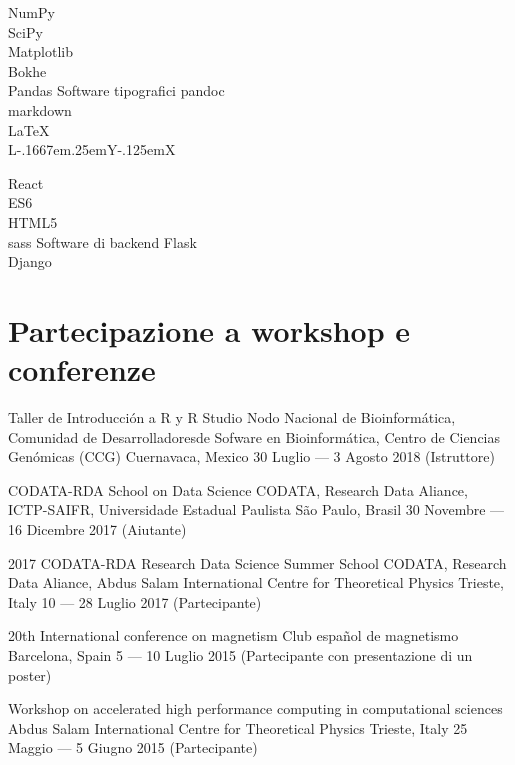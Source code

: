 \documentclass[12pt,english]{moderncv}
\makeatletter
\providecommand{\LyX}{\texorpdfstring%
  {L\kern-.1667em\lower.25em\hbox{Y}\kern-.125emX\@}
  {LyX}}
\makeatother
\begin{document}
    {NumPy\\SciPy\\Matplotlib\\Bokhe\\Pandas}
           {Software tipografici}    {pandoc\\markdown\\\LaTeX{}\\\LyX{}}


    {React\\ES6\\HTML5\\sass}
           {Software di backend}       {Flask\\Django}


\section{Partecipazione a workshop e conferenze}

        {Taller de Introducción a R y R Studio}
        {%
            Nodo Nacional de Bioinformática, Comunidad de Desarrolladoresde
            Sofware en Bioinformática, Centro de Ciencias Genómicas (CCG)
        }
        {Cuernavaca, Mexico}
        {30 Luglio --- 3 Agosto 2018}
        {(Istruttore)}

        {CODATA-RDA School on Data Science}
        {CODATA, Research Data Aliance, ICTP-SAIFR, Universidade Estadual Paulista}
        {São Paulo, Brasil}
        {30 Novembre --- 16 Dicembre 2017}
        {(Aiutante)}

        {2017 CODATA-RDA Research Data Science Summer School}
        {CODATA, Research Data Aliance, Abdus Salam International Centre for Theoretical Physics}
        {Trieste, Italy}
        {10 --- 28 Luglio 2017}
        {(Partecipante)}

        {20th International conference on magnetism}
        {Club español de magnetismo}
        {Barcelona, Spain}
        {5 --- 10 Luglio 2015}
        {(Partecipante con presentazione di un poster)}

        {Workshop on accelerated high performance computing in computational sciences}
        {Abdus Salam International Centre for Theoretical Physics}
        {Trieste, Italy}
        {25 Maggio --- 5 Giugno 2015}
        {(Partecipante)}
\end{document}
